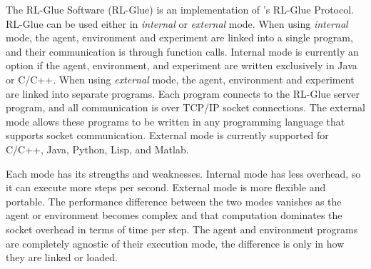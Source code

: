 \documentclass[twoside,11pt]{article}
\begin{document}

The RL-Glue Software (RL-Glue) is an implementation of \citeauthor{whiteThesis}'s RL-Glue Protocol.  RL-Glue can be used either in {\it internal} or {\it external} mode.  When using \textit{internal} mode, the agent, environment and experiment are linked into a single program, and their communication is through function calls.  Internal mode is currently an option if the agent, environment, and experiment are written exclusively in Java or C/C++.  When using  \textit{external} mode, the agent, environment and experiment are linked into separate programs.  Each program connects to the RL-Glue server program, and all communication is over TCP/IP socket connections. The external mode allows these programs to be written in any programming language that supports socket communication.  External mode is currently supported for C/C++, Java, Python, Lisp, and Matlab.

Each mode has its strengths and weaknesses. Internal mode has less overhead, so it can execute more steps per second. External mode is more flexible and portable.  The performance difference between the two modes vanishes as the agent or environment becomes complex and that computation dominates the socket overhead in terms of time per step.  The agent and environment programs are completely agnostic of their execution mode, the difference is only in how they are linked or loaded.

\end{document}
